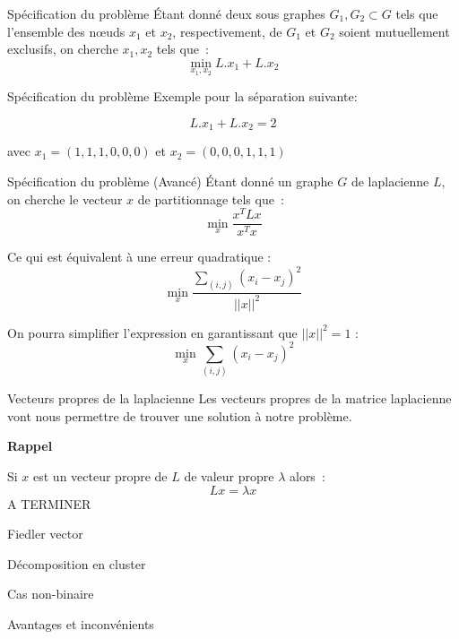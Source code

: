 \begin{frame}{Spécification du problème}
    Étant donné deux sous graphes $G_1,G_2 \subset G$ tels que l'ensemble des nœuds $x_1$ et $x_2$, respectivement, de $G_1$ et $G_2$ soient mutuellement exclusifs, on cherche $x_1, x_2$ tels que~:
    $$
        \min_{x_1, x_2} L.x_1 + L.x_2
    $$
\end{frame}

\begin{frame}{Spécification du problème}
    Exemple pour la séparation suivante:


    $$
        L.x_1 + L.x_2 = 2
    $$

    avec $x_1 = (1,1,1,0,0,0)$ et $x_2 = (0,0,0,1,1,1)$
\end{frame}

\begin{frame}{Spécification du problème (Avancé)}
    Étant donné un graphe $G$ de laplacienne $L$, on cherche le vecteur $x$ de partitionnage tels que~:
    $$
        \min_{x} \frac{x^T L x}{x^T x}
    $$

    Ce qui est équivalent à une erreur quadratique :
    $$
        \min_x \frac{\sum_{(i,j)}(x_i-x_j)^2}{||x||^2}
    $$
    
    On pourra simplifier l'expression en garantissant que $||x||^2 = 1$ :
    $$
        \min_x \sum_{(i,j)}(x_i-x_j)^2
    $$
\end{frame}



\begin{frame}{Vecteurs propres de la laplacienne}
    Les vecteurs propres de la matrice laplacienne vont nous permettre de trouver une solution à notre problème.

    \textbf{\alert{Rappel}}

    Si $x$ est un vecteur propre de $L$ de valeur propre $\lambda$ alors~:
    $$
        Lx = \lambda x
    $$
    A TERMINER
\end{frame}
 
\begin{frame}{Fiedler vector}
\end{frame}

\begin{frame}{Décomposition en cluster}
\end{frame}

\begin{frame}{Cas non-binaire}
\end{frame}

\begin{frame}{Avantages et inconvénients}
\end{frame}